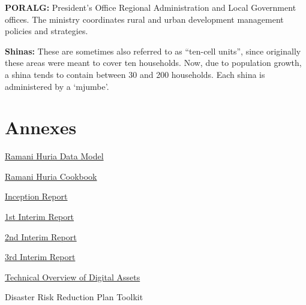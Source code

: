 \documentclass[a4paper,12pt,twoside]{article}
\begin{document}
\textbf{PORALG:} President's Office Regional Administration and Local Government offices. The ministry coordinates rural and urban development management policies and strategies.


\textbf{Shinas:} These are sometimes also referred to as “ten-cell units”, since originally these areas were meant to cover ten households. Now, due to population growth, a shina tends to contain between 30 and 200 households. Each shina is administered by a ‘mjumbe’.

\section{Annexes}
\href{https://wiki.openstreetmap.org/wiki/Dar_es_Salaam/Ramani_Huria}{Ramani Huria Data Model}

\href{https://drive.google.com/file/d/1M0jcJHxdIDlrCRr09c4G8ZVlvl43j_1b/view}{Ramani Huria Cookbook}

\href{https://docs.google.com/document/d/1PwHRtdRvOfeEhpsIl-gpQXTTDoVwW_0--wRsmeUhVt4/edit#}{Inception Report}

\href{https://docs.google.com/document/d/1oW4y4ZT76viHu_sDnrBYrFsJfu_a0CAn9GLIxmG_rpc/edit}{1st Interim Report}

\href{https://docs.google.com/document/d/1Zn35NGLn2n-X93Z2hwiWwQwUnMljCoD7hwTUrTEXxTg/edit}{2nd Interim Report}

\href{https://docs.google.com/document/d/1D03BG5Pkmo0XMIyrvvgVLqdeyfkmwxRRs3UQdekNspk/edit}{3rd Interim Report}

\href{https://docs.google.com/document/d/1Cc-ztcmc53LqlqhAXC1neCyxuRJujN16nhcibMg04qw/edit}{Technical Overview of Digital Assets}

Disaster Risk Reduction Plan Toolkit
\end{document}
